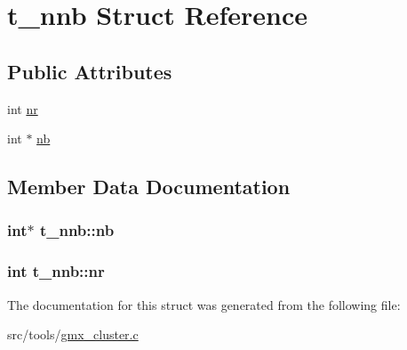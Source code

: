 \hypertarget{structt__nnb}{\section{t\-\_\-nnb \-Struct \-Reference}
\label{structt__nnb}
}
\subsection*{\-Public \-Attributes}
\begin{DoxyCompactItemize}
\item 
int \hyperlink{structt__nnb_abf9d0c628308ceb7169478841fa65c81}{nr}
\item 
int $\ast$ \hyperlink{structt__nnb_aa8ac865c7f17dae07cd6d6caa23223b7}{nb}
\end{DoxyCompactItemize}


\subsection{\-Member \-Data \-Documentation}
\hypertarget{structt__nnb_aa8ac865c7f17dae07cd6d6caa23223b7}{
\subsubsection[{nb}]{\setlength{\rightskip}{0pt plus 5cm}int$\ast$ {\bf t\-\_\-nnb\-::nb}}}\label{structt__nnb_aa8ac865c7f17dae07cd6d6caa23223b7}
\hypertarget{structt__nnb_abf9d0c628308ceb7169478841fa65c81}{
\subsubsection[{nr}]{\setlength{\rightskip}{0pt plus 5cm}int {\bf t\-\_\-nnb\-::nr}}}\label{structt__nnb_abf9d0c628308ceb7169478841fa65c81}


\-The documentation for this struct was generated from the following file\-:\begin{DoxyCompactItemize}
\item 
src/tools/\hyperlink{gmx__cluster_8c}{gmx\-\_\-cluster.\-c}\end{DoxyCompactItemize}
